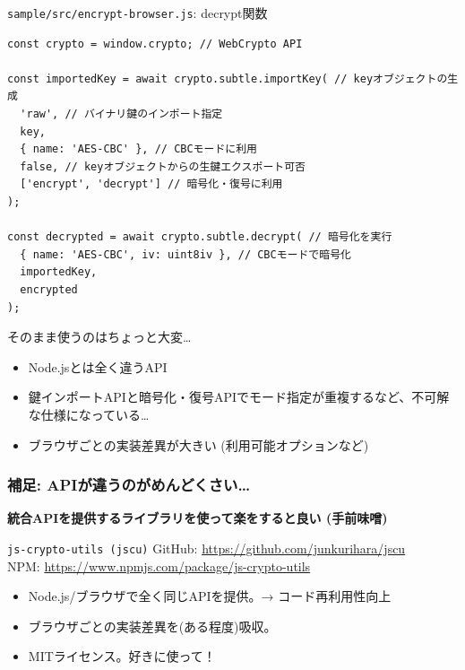 \documentclass[12pt,dvipdfmx]{beamer}
\begin{document}
\begin{frame}[fragile]
\begin{block}{\small \texttt{sample/src/encrypt-browser.js}: decrypt関数}
\scriptsize
\begin{verbatim}
const crypto = window.crypto; // WebCrypto API

const importedKey = await crypto.subtle.importKey( // keyオブジェクトの生成
  'raw', // バイナリ鍵のインポート指定
  key,
  { name: 'AES-CBC' }, // CBCモードに利用
  false, // keyオブジェクトからの生鍵エクスポート可否
  ['encrypt', 'decrypt'] // 暗号化・復号に利用
);

const decrypted = await crypto.subtle.decrypt( // 暗号化を実行
  { name: 'AES-CBC', iv: uint8iv }, // CBCモードで暗号化
  importedKey,
  encrypted
);
\end{verbatim}
\end{block}

{\footnotesize
そのまま使うのはちょっと大変…
\begin{itemize}
 \item Node.jsとは全く違うAPI
 \item 鍵インポートAPIと暗号化・復号APIでモード指定が重複するなど、不可解な仕様になっている…
 \item \alert{ブラウザごとの実装差異が大きい} (利用可能オプションなど)
\end{itemize}
}
\end{frame}

\begin{frame}
\frametitle{補足: APIが違うのがめんどくさい…}
\small 
\textbf{統合APIを提供するライブラリを使って楽をすると良い (手前味噌)}

\begin{block}{\texttt{js-crypto-utils (jscu)}}
GitHub: \url{https://github.com/junkurihara/jscu}\\
NPM: \url{https://www.npmjs.com/package/js-crypto-utils}
\end{block}

\begin{itemize}
\item Node.js/ブラウザで全く同じAPIを提供。→ コード再利用性向上
\item ブラウザごとの実装差異を(ある程度)吸収。
\item MITライセンス。好きに使って！
\end{itemize}
\end{frame}
\end{document}
